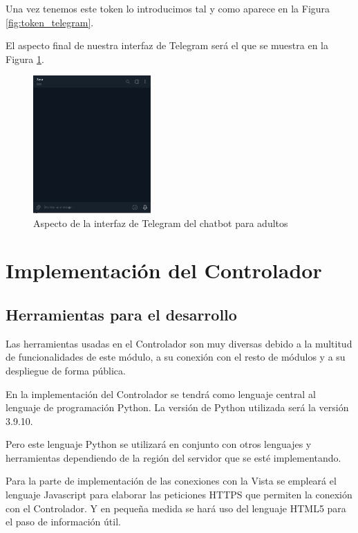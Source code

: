 Una vez tenemos este token lo introducimos tal y como aparece en la Figura \ref{fig:token_telegram}.

El aspecto final de nuestra interfaz de Telegram será el que se muestra en la Figura \ref{fig:interfaz_telegram}.

\begin{figure}[h]
\centering
\includegraphics[width=0.4\textwidth]{imagenes/07_Implementacion/interfaz_telegram.png}
\caption{Aspecto de la interfaz de Telegram del chatbot para adultos}
\label{fig:interfaz_telegram}
\end{figure}


\section{Implementación del Controlador}

\subsection{Herramientas para el desarrollo} \label{subsec:herramientas_controlador}

Las herramientas usadas en el Controlador son muy diversas debido a la multitud de funcionalidades de este módulo, a su conexión con el resto de módulos y a su despliegue de forma pública.

En la implementación del Controlador se tendrá como lenguaje central al lenguaje de programación Python. La versión de Python utilizada será la versión 3.9.10.

Pero este lenguaje Python se utilizará en conjunto con otros lenguajes y herramientas dependiendo de la región del servidor que se esté implementando.

Para la parte de implementación de las conexiones con la Vista se empleará el lenguaje Javascript para elaborar las peticiones HTTPS que permiten la conexión con el Controlador. Y en pequeña medida se hará uso del lenguaje HTML5 para el paso de información útil.

